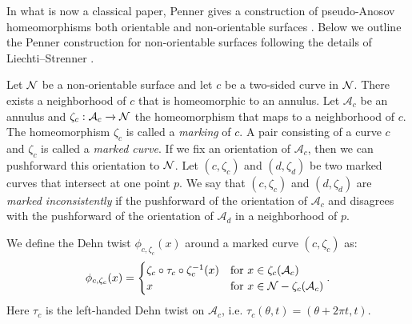 In what is now a classical paper, Penner gives a construction of pseudo-Anosov homeomorphisms both orientable and non-orientable surfaces \cite{penner1988construction}.  Below we outline the Penner construction for non-orientable surfaces following the details of Liechti--Strenner \cite[Section 2]{LS}.

%

  Let $\mathcal{N}$ be a non-orientable surface and let $c$ be a two-sided curve in $\mathcal{N}$.  There exists a neighborhood of $c$ that is homeomorphic to an annulus.  Let $\mathcal{A}_c$ be an annulus and $\zeta_c: \mathcal{A}_c \xrightarrow{} \mathcal{N}$ the homeomorphism that maps to a neighborhood of $c$.  The homeomorphism $\zeta_c$ is called a \textit{marking} of $c$. A pair consisting of a curve $c$ and $\zeta_c$ is called a {\it marked curve}.  
 If we fix an
orientation of $\mathcal{A}_c$, then we can pushforward this orientation to $\mathcal{N}$. Let
$(c,\zeta_c)$ and $(d,\zeta_d)$ be two marked curves that intersect at one point $p$.  We say that $(c,\zeta_c)$ and $(d,\zeta_d)$ are {\it marked inconsistently} if the
pushforward of the orientation of $\mathcal{A}_c$ and disagrees with the pushforward of the orientation of $\mathcal{A}_d$ in a neighborhood of $p$.

 We define the Dehn twist $\phi_{c,\zeta_c}(x)$ around a marked curve $(c,\zeta_c)$ as:
\begin{align*}
  \phi_{c,\zeta_c}(x) =
  \begin{cases}
    \zeta_c \circ \tau_c \circ \zeta_c^{-1}(x) & \text{for } x \in \zeta_c(\mathcal{A}_c) \\
    x & \text{for } x \in \mathcal{N} - \zeta_c(\mathcal{A}_c)
  \end{cases}.
\end{align*}
Here $\tau_c$ is the left-handed Dehn twist on $\mathcal{A}_c$, i.e. $\tau_c(\theta,t) = (\theta + 2\pi t,t)$. 

